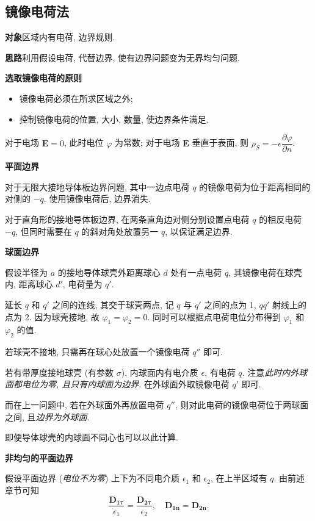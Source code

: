 \subsection{镜像电荷法}
\textbf{对象}\quad 区域内有电荷, 边界规则.

\textbf{思路}\quad 利用假设电荷, 代替边界, 使有边界问题变为无界均匀问题.

\textbf{选取镜像电荷的原则}
\begin{itemize}
    \item 镜像电荷必须在所求区域之外;
    \item 控制镜像电荷的位置, 大小, 数量, 使边界条件满足.
\end{itemize}

对于电场 $\bm{E}=0$, 此时电位 $\varphi$ 为常数; 对于电场 $\bm{E}$ 垂直于表面, 则 $\rho_S=-\epsilon\dfrac{\partial\varphi}{\partial n}$.

\textbf{平面边界}

对于无限大接地导体板边界问题, 其中一边点电荷 $q$ 的镜像电荷为位于距离相同的对侧的 $-q$. 使用镜像电荷后, 边界消失.

对于直角形的接地导体板边界, 在两条直角边对侧分别设置点电荷 $q$ 的相反电荷 $-q$, 但同时需要在 $q$ 的斜对角处放置另一 $q$, 以保证满足边界.

\textbf{球面边界}

假设半径为 $a$ 的接地导体球壳外距离球心 $d$ 处有一点电荷 $q$, 其镜像电荷在球壳内, 距离球心 $d'$, 电荷量为 $q'$.

延长 $q$ 和 $q'$ 之间的连线, 其交于球壳两点, 记 $q$ 与 $q'$ 之间的点为 1, $qq'$ 射线上的点为 2. 因为球壳接地, 故 $\varphi_1=\varphi_2=0$. 同时可以根据点电荷电位分布得到 $\varphi_1$ 和 $\varphi_2$ 的值.

若球壳不接地, 只需再在球心处放置一个镜像电荷 $q''$ 即可.

若有带厚度接地球壳 (有参数 $\sigma$), 内球面内有电介质 $\epsilon$, 有电荷 $q$. 注意\textit{此时内外球面都电位为零, 且只有内球面为边界}. 在外球面外取镜像电荷 $q'$ 即可.

而在上一问题中, 若在外球面外再放置电荷 $q''$, 则对此电荷的镜像电荷位于两球面之间, 且\textit{边界为外球面}.

即便导体球壳的内球面不同心也可以以此计算.

\textbf{非均匀的平面边界}

假设平面边界 (\textit{电位不为零}) 上下为不同电介质 $\epsilon_1$ 和 $\epsilon_2$, 在上半区域有 $q$. 由前述章节可知
\begin{equation}
    \frac{\bm{D_{1\tau}}}{\epsilon_1}=\frac{\bm{D_{2\tau}}}{\epsilon_2}, \quad \bm{D_{1n}}=\bm{D_{2n}}.
\end{equation}

